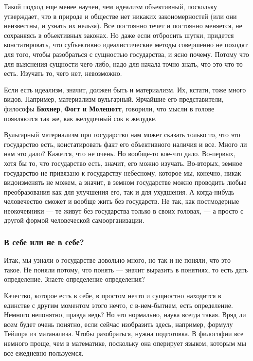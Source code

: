 Такой подход еще менее научен, чем идеализм объективный, поскольку утверждает,
что в природе и обществе нет никаких закономерностей (или они неизвестны, и
узнать их нельзя). Все постоянно течет и постоянно меняется, не сохраняясь в
объективных законах. Но даже если отбросить шутки, придется констатировать, что
субъективно идеалистические методы совершенно не походят для того, чтобы
разобраться с сущностью государства, и ясно почему. Потому что для выяснения
сущности чего-либо, надо для начала точно знать, что это что-то есть. Изучать
то, чего нет, невозможно.

Если есть идеализм, значит, должен быть и материализм. Их, кстати, тоже много
видов. Например, материализм вульгарный. Ярчайшие его представители, философы
\textbf{Бюхнер}, \textbf{Фогт и Молешотт}, говорили, что мысли в голове появляются так же, как
желудочный сок в желудке.

Вульгарный материализм про государство нам может сказать только то, что это
государство есть, констатировать факт его объективного наличия и все. Много ли
нам это дало? Кажется, что не очень. Но вообще-то кое-что дало. Во-первых, хотя
бы то, что государство есть, значит, его можно изучать. Во-вторых, земное
государство не привязано к государству небесному, которое мы, конечно, никак
видоизменять не можем, а значит, в земном государстве можно проводить любые
преобразования как для улучшения его, так и для ухудшения. А когда-нибудь
человечество сможет и вообще жить без государств. Не так, как постмодерные
неокочевники — те живут без государства только в своих головах, — а просто с
другой формой человеческой самоорганизации.

\subsubsection{В себе или не в себе?}

Итак, мы узнали о государстве довольно много, но так и не поняли, что это
такое. Не поняли потому, что понять — значит выразить в понятиях, то есть дать
определение. Знаете определение определения?

Качество, которое есть в себе, в простом нечто и сущностно находится в единстве
с другим моментом этого нечто, с в-нем-бытием, есть определение. Немного
непонятно, правда ведь? Но это нормально, наука всегда такая. Вряд ли всем
будет очень понятно, если сейчас изобразить здесь, например, формулу Тейлора из
матанализа. Чтобы разобраться, нужна подготовка. В философии все немного проще,
чем в математике, поскольку она оперирует языком, которым мы все ежедневно
пользуемся.


